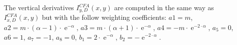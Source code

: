 \documentclass[twoside]{article}
\DeclareMathOperator{\e}{e}
\begin{document}
The vertical derivatives $I^{CFA}_{y,D}(x,y)$ are computed in the same way as $I^{CFA}_{x,D}(x,y)$ but with the follow weighting coefficients:  
$a1=m$, $a2=m \cdot (\alpha -1)\cdot \e ^{-\alpha}$, $a3= m \cdot (\alpha +1)\cdot \e ^{-\alpha}$, $a4=-m \cdot \e ^{-2 \cdot \alpha}$,  $a_5 = 0$, $a6 = 1$, $a_7 = -1$, $a_8 =0$, $b_1 = 2\cdot \e ^{-\alpha}$, $b_2 = -\e ^{-2 \cdot \alpha}$.  






	
	
	
	
	
	
	
\end{document}
